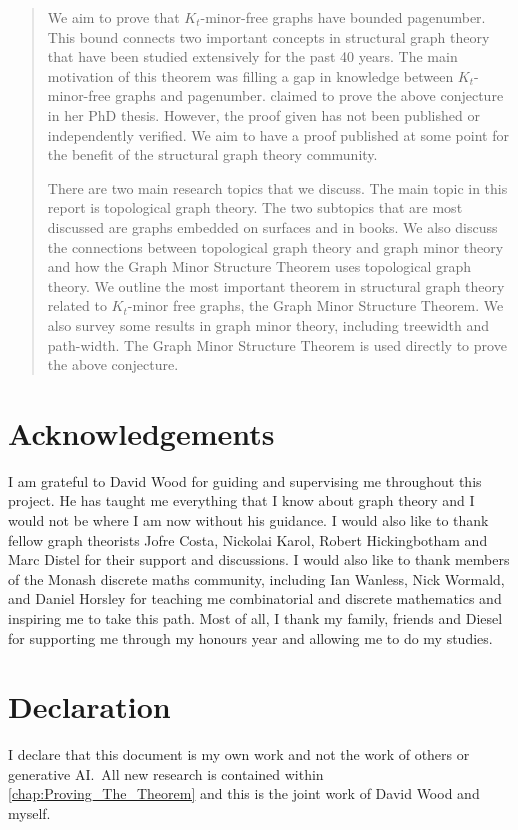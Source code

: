 \begin{abstract}
	We aim to prove that \(K_t\)-minor-free graphs have bounded pagenumber. This bound connects two important concepts in structural graph theory that have been studied extensively for the past 40 years. The main motivation of this theorem was filling a gap in knowledge between $K_t$-minor-free graphs and pagenumber. \textcite{Blankenship-PhD03} claimed to prove the above conjecture in her PhD thesis. However, the proof given has not been published or independently verified. We aim to have a proof published at some point for the benefit of the structural graph theory community. 

	There are two main research topics that we discuss.
	The main topic in this report is topological graph theory. The two subtopics that are most discussed are graphs embedded on surfaces and in books. We also discuss the connections between topological graph theory and graph minor theory and how the Graph Minor Structure Theorem uses topological graph theory. 
	We outline the most important theorem in structural graph theory related to \(K_t\)-minor free graphs, the Graph Minor Structure Theorem. We also survey some results in graph minor theory, including treewidth and path-width. The Graph Minor Structure Theorem is used directly to prove the above conjecture. 
\end{abstract}
\newpage

\section{Acknowledgements}
I am grateful to David Wood for guiding and supervising me throughout this project. He has taught me everything that I know about graph theory and I would not be where I am now without his guidance. I would also like to thank fellow graph theorists Jofre Costa, Nickolai Karol, Robert Hickingbotham and Marc Distel for their support and discussions. I would also like to thank members of the Monash discrete maths community, including Ian Wanless, Nick Wormald, and Daniel Horsley for teaching me combinatorial and discrete mathematics and inspiring me to take this path. Most of all, I thank my family, friends and Diesel for supporting me through my honours year and allowing me to do my studies.

\section{Declaration}

I declare that this document is my own work and not the work of others or generative AI.\ All new research is contained within \cref{chap:Proving_The_Theorem} and this is the joint work of David Wood and myself.